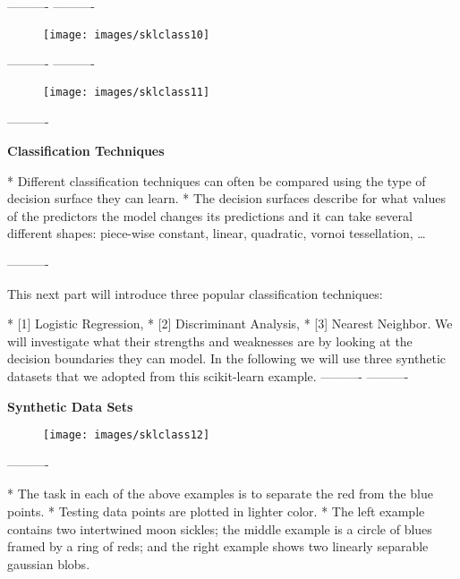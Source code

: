 \newpage
----------%
----------%
\begin{figure}[h!]
\centering
\texttt{[image: images/sklclass10]}

\end{figure}

----------%
----------%
\begin{figure}[h!]
\centering
\texttt{[image: images/sklclass11]}

\end{figure}

----------%
\newpage

\textbf{Classification Techniques}

*   Different classification techniques can often be compared using the type of decision surface they can learn. *   The decision surfaces describe for what values of the predictors the model changes its predictions and it can take several different shapes: piece-wise constant, linear, quadratic, vornoi tessellation, \ldots


----------%

 This next part will introduce three popular classification techniques: 

*  [1] Logistic Regression, 
*  [2] Discriminant Analysis, 
*  [3] Nearest Neighbor.
 We will investigate what their strengths and weaknesses are by looking at the decision boundaries they can model. In the following we will use three synthetic datasets that we adopted from this scikit-learn example.
----------%
----------%

\newpage
\textbf{Synthetic Data Sets}
\begin{figure}[h!]
\centering
\texttt{[image: images/sklclass12]}

\end{figure}
----------%


*   The task in each of the above examples is to separate the red from the blue points. 
*   Testing data points are plotted in lighter color. 
*   The left example contains two intertwined moon sickles; the middle example is a circle of blues framed by a ring of reds; and the right example shows two linearly separable gaussian blobs.


